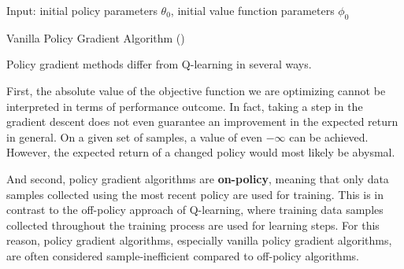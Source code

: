 \begin{algorithm}[H]
  Input: initial policy parameters $\theta_0$, initial value function parameters $\phi_0$
  
  
  \caption{Vanilla Policy Gradient Algorithm (\cite{SpinningUpIntro})}
  \label{Vanilla}
\end{algorithm}

Policy gradient methods differ from Q-learning in several ways.

First, the absolute value of the objective function we are optimizing cannot be interpreted in terms of performance outcome.
In fact, taking a step in the gradient descent does not even guarantee an improvement in the expected return in general.
On a given set of samples, a value of even $-\infty$ can be achieved. 
However, the expected return of a changed policy would most likely be abysmal.

And second, policy gradient algorithms are \textbf{on-policy}, meaning that only data samples collected using the most recent policy are used for training.
This is in contrast to the off-policy approach of Q-learning, where training data samples collected throughout the training process are used for learning steps.
For this reason, policy gradient algorithms, especially vanilla policy gradient algorithms, are often considered sample-inefficient compared to off-policy algorithms.

